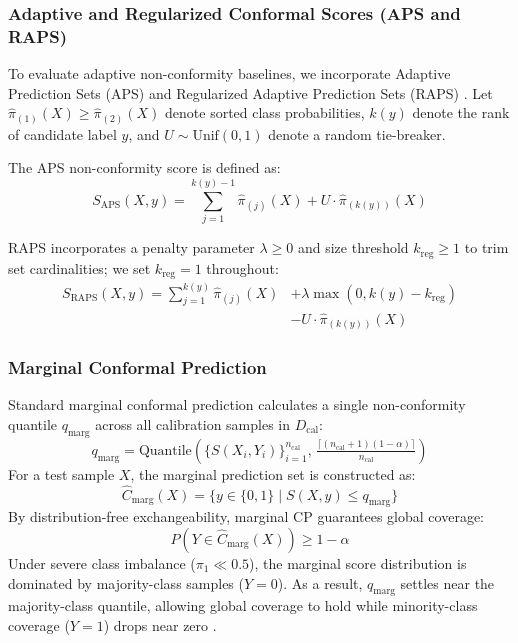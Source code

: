 \documentclass{ieeetj}
\begin{document}
\subsubsection{Adaptive and Regularized Conformal Scores (APS and RAPS)}
To evaluate adaptive non-conformity baselines, we incorporate Adaptive Prediction Sets (APS) \cite{romano2020classification} and Regularized Adaptive Prediction Sets (RAPS) \cite{angelopoulos2021uncertainty}. Let $\hat{\pi}_{(1)}(X) \ge \hat{\pi}_{(2)}(X)$ denote sorted class probabilities, $k(y)$ denote the rank of candidate label $y$, and $U \sim \text{Unif}(0,1)$ denote a random tie-breaker.

The APS non-conformity score is defined as:
\begin{equation}
S_{\mathrm{APS}}(X, y) = \sum_{j=1}^{k(y)-1} \hat{\pi}_{(j)}(X) + U \cdot \hat{\pi}_{(k(y))}(X)
\end{equation}

RAPS incorporates a penalty parameter $\lambda \ge 0$ and size threshold $k_{\mathrm{reg}} \ge 1$ to trim set cardinalities; we set $k_{\mathrm{reg}} = 1$ throughout:
\begin{equation}
\begin{split}
S_{\mathrm{RAPS}}(X, y) = \sum_{j=1}^{k(y)} \hat{\pi}_{(j)}(X) &+ \lambda \max(0, k(y) - k_{\mathrm{reg}}) \\
&- U \cdot \hat{\pi}_{(k(y))}(X)
\end{split}
\end{equation}

\subsubsection{Marginal Conformal Prediction}
Standard marginal conformal prediction calculates a single non-conformity quantile $q_{\mathrm{marg}}$ across all calibration samples in $D_{\mathrm{cal}}$:
\begin{equation}
q_{\mathrm{marg}} = \text{Quantile}\!\left(\{S(X_i, Y_i)\}_{i=1}^{n_{\mathrm{cal}}}, \, \tfrac{\lceil (n_{\mathrm{cal}}+1)(1-\alpha) \rceil}{n_{\mathrm{cal}}}\right)
\end{equation}
For a test sample $X$, the marginal prediction set is constructed as:
\begin{equation}
\hat{C}_{\mathrm{marg}}(X) = \{y \in \{0, 1\} \mid S(X, y) \le q_{\mathrm{marg}}\}
\end{equation}
By distribution-free exchangeability, marginal CP guarantees global coverage:
\begin{equation}
P(Y \in \hat{C}_{\mathrm{marg}}(X)) \ge 1 - \alpha
\end{equation}
Under severe class imbalance ($\pi_1 \ll 0.5$), the marginal score distribution is dominated by majority-class samples ($Y=0$). As a result, $q_{\mathrm{marg}}$ settles near the majority-class quantile, allowing global coverage to hold while minority-class coverage ($Y=1$) drops near zero \cite{vovk2012conditional, ding2023class}.
\end{document}
